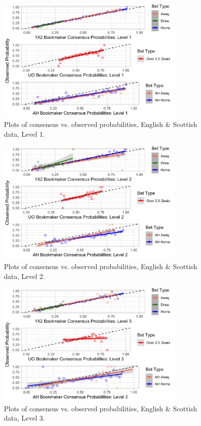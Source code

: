 \documentclass[a4paper,10pt]{report}
\begin{document}
\begin{figure}[h!]\begin{center}
		\includegraphics[width=0.82\textwidth]{ensco_13_level1.png}
		\caption{Plots of consensus vs. observed probabilities, English \& Scottish data, Level 1.}\label{FIG:02_bylevel_1}
\end{center}\end{figure}
\begin{figure}[h!]\begin{center}
		\includegraphics[width=0.82\textwidth]{ensco_13_level2.png}
		\caption{Plots of consensus vs. observed probabilities, English \& Scottish data, Level 2.}\label{FIG:02_bylevel_2}
\end{center}\end{figure}
\begin{figure}[h!]\begin{center}
		\includegraphics[width=0.82\textwidth]{ensco_13_level3.png}
		\caption{Plots of consensus vs. observed probabilities, English \& Scottish data, Level 3.}\label{FIG:02_bylevel_3}
\end{center}\end{figure}
\end{document}

